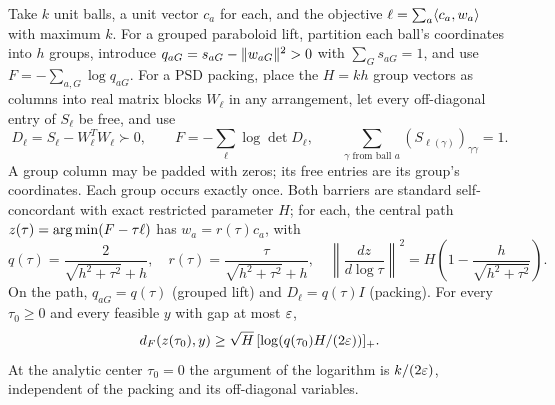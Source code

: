 Take $k$ unit balls, a unit vector $c_a$ for each, and the objective
$\ell=\sum_a\langle c_a,w_a\rangle$ with maximum $k$.
For a grouped paraboloid lift, partition each ball's coordinates into
$h$ groups, introduce $q_{aG}=s_{aG}-\lVert w_{aG}\rVert^2>0$ with
$\sum_Gs_{aG}=1$, and use $F=-\sum_{a,G}\log q_{aG}$.
For a PSD packing, place the
$H=kh$ group vectors as columns into real matrix blocks $W_\ell$ in any
arrangement, let every off-diagonal entry of $S_\ell$ be free, and use
\[
 D_\ell=S_\ell-W_\ell^TW_\ell\succ0,\qquad
 F=-\sum_\ell\log\det D_\ell,
 \qquad \sum_{\gamma\text{ from ball }a}(S_{\ell(\gamma)})_{\gamma\gamma}=1.
\]
A group column may be padded with zeros; its free entries are its
group's coordinates. Each group occurs exactly once.
Both barriers are standard self-concordant with exact restricted
parameter $H$; for each, the central path
$z(\tau)=\operatorname*{arg\,min}(F-\tau\ell)$ has
$w_a=r(\tau)c_a$, with
\begin{equation}
 q(\tau)=\frac{2}{\sqrt{h^2+\tau^2}+h},\quad
 r(\tau)=\frac{\tau}{\sqrt{h^2+\tau^2}+h},\quad
 \left\|\frac{dz}{d\log\tau}\right\|^2
   =H\left(1-\frac h{\sqrt{h^2+\tau^2}}\right).
 \label{eq:grouped-packed-center}
\end{equation}
On the path, $q_{aG}=q(\tau)$ (grouped lift) and
$D_\ell=q(\tau)I$ (packing). For every $\tau_0\geq0$ and every
feasible $y$ with gap at most $\varepsilon$,
\begin{equation}
 d_F(z(\tau_0),y)\geq\sqrt H\,
          [\log(q(\tau_0)H/(2\varepsilon))]_+.
 \label{eq:grouped-packed-distance}
\end{equation}
At the analytic center $\tau_0=0$ the argument of the logarithm is
$k/(2\varepsilon)$, independent of the packing and its off-diagonal
variables.


